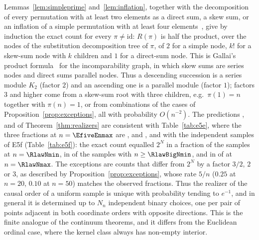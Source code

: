 \noindent Lemmas~\ref{lem:simpleprime} and~\ref{lem:inflation}, together with the decomposition of every permutation with at least two elements as a direct sum, a skew sum, or an inflation of a simple permutation with at least four elements~\citep{albert2005}, give by induction the exact count for every $\pi\ne\mathrm{id}$: $R(\pi)$ is half the product, over the nodes of the substitution decomposition tree of $\pi$, of $2$ for a simple node, $k!$ for a skew-sum node with $k$ children and $1$ for a direct-sum node. This is Gallai's product formula~\citep{gallai1967} for the incomparability graph, in which skew sums are series nodes and direct sums parallel nodes. Thus a descending succession is a series module $K_2$ (factor $2$) and an ascending one is a parallel module (factor $1$); factors $3$ and higher come from a skew-sum root with three children, e.g.\ $\pi(1)=n$ together with $\pi(n)=1$, or from combinations of the cases of Proposition~\ref{prop:exceptions}, all with probability $O(n^{-2})$. 
\if{} The predictions \RlawPoissonOne, \RlawPoissonOne{} and \RlawPoissonLeThree{} of Theorem~\ref{thm:realizers} are consistent with Table~\ref{tab:e5e}, where the three fractions at $n=\EfiveEnmax$ are \EfiveEuniqueNmax, \EfiveEtwoNmax{} and \EfiveEleEightNmax, and with the independent samples of E5f (Table~\ref{tab:e5f}): the exact count equalled $2^N$ in a fraction \RlawEqualFracNmin{} of the samples at $n=\RlawNmin$, in \RlawEqualBig{} of the \RlawSamplesBig{} samples with $n\ge\RlawBigNmin$, and in \RlawEqualNmax{} of \RlawSamplesNmax{} at $n=\RlawNmax$. The exceptions are counts that differ from $2^N$ by a factor $3/2$, $2$ or $3$, as described by Proposition~\ref{prop:exceptions}, whose rate $5/n$ ($0.25$ at $n=20$, $0.10$ at $n=50$) matches the observed fractions. \fi Thus the realizer of the causal order of a uniform sample is unique with probability tending to $e^{-1}$, and in general it is determined up to $N_n$ independent binary choices, one per pair of points adjacent in both coordinate orders with opposite directions. This is the finite analogue of the continuum theorems, and it differs from the Euclidean ordinal case, where the kernel class always has non-empty interior.
